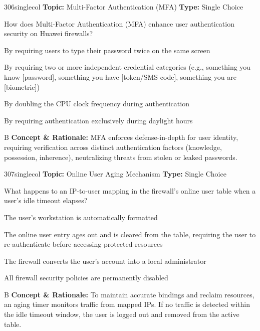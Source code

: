 \begin{qcard}{306}{singlecol}
\textcolor{darkslate!75}{\small\textbf{Topic:} Multi-Factor Authentication (MFA) \hfill \textbf{Type:} Single Choice}\vspace{0.4em}\par
How does Multi-Factor Authentication (MFA) enhance user authentication security on Huawei firewalls?
\begin{qoptions}
\item By requiring users to type their password twice on the same screen
\item By requiring two or more independent credential categories (e.g., something you know [password], something you have [token/SMS code], something you are [biometric])
\item By doubling the CPU clock frequency during authentication
\item By requiring authentication exclusively during daylight hours
\end{qoptions}
\end{qcard}
\nopagebreak
\begin{explainbox}{B}
\textbf{Concept \& Rationale:} MFA enforces defense-in-depth for user identity, requiring verification across distinct authentication factors (knowledge, possession, inherence), neutralizing threats from stolen or leaked passwords.
\end{explainbox}

\begin{qcard}{307}{singlecol}
\textcolor{darkslate!75}{\small\textbf{Topic:} Online User Aging Mechanism \hfill \textbf{Type:} Single Choice}\vspace{0.4em}\par
What happens to an IP-to-user mapping in the firewall's online user table when a user's idle timeout elapses?
\begin{qoptions}
\item The user's workstation is automatically formatted
\item The online user entry ages out and is cleared from the table, requiring the user to re-authenticate before accessing protected resources
\item The firewall converts the user's account into a local administrator
\item All firewall security policies are permanently disabled
\end{qoptions}
\end{qcard}
\nopagebreak
\begin{explainbox}{B}
\textbf{Concept \& Rationale:} To maintain accurate bindings and reclaim resources, an aging timer monitors traffic from mapped IPs. If no traffic is detected within the idle timeout window, the user is logged out and removed from the active table.
\end{explainbox}

